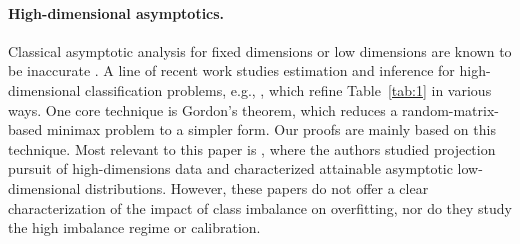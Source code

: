 \paragraph{High-dimensional asymptotics.} Classical asymptotic analysis for fixed dimensions or low dimensions are known to be inaccurate \cite{el2013robust, donoho2016high}. A line of recent work studies estimation and inference for high-dimensional classification problems, e.g., \cite{dobriban2018high, Pragya_highdim_logistic, sur2019logistic, candes2020logistic, montanari2023generalizationerrormaxmarginlinear, kini2021label, deng2022model, mignacco2020role, salehi2019impact, montanari2024tractability}, which refine Table~\ref{tab:1} in various ways. One core technique is Gordon's theorem, which reduces a random-matrix-based minimax problem to a simpler form. Our proofs are mainly based on this technique. Most relevant to this paper is \cite{montanari2022overparametrizedlineardimensionalityreductions}, where the authors studied projection pursuit of high-dimensions data and characterized attainable asymptotic low-dimensional distributions. However, these papers do not offer a clear characterization of the impact of class imbalance on overfitting, nor do they study the high imbalance regime or calibration.




